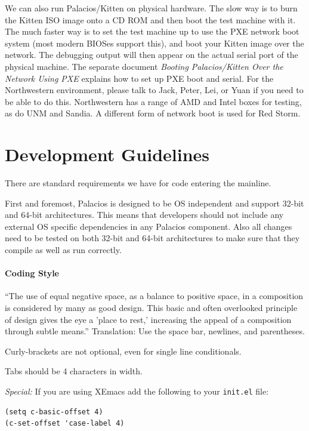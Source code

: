 \documentclass[11pt]{article}
\begin{document}
We can also run Palacios/Kitten on physical hardware.  The slow way is
to burn the Kitten ISO image onto a CD ROM and then boot the test
machine with it.  The much faster way is to set the test machine up to
use the PXE network boot system (most modern BIOSes support this), and
boot your Kitten image over the network.  The debugging output will
then appear on the actual serial port of the physical machine.  The
separate document {\em Booting Palacios/Kitten Over the Network Using
PXE} explains how to set up PXE boot and serial.  For the Northwestern
environment, please talk to Jack, Peter, Lei, or Yuan if you need to
be able to do this.  Northwestern has a range of AMD and Intel boxes
for testing, as do UNM and Sandia.  A different form of network boot
is used for Red Storm.


\section{Development Guidelines}

There are standard requirements we have for code entering the mainline. 

First and foremost, Palacios is designed to be OS independent and
support 32-bit and 64-bit architectures. This means that developers should
not include any external OS specific dependencies in any Palacios
component. Also all changes need to be tested on both 32-bit and 64-bit
architectures to make sure that they compile as well as run correctly.

\paragraph*{Coding Style}

``The use of equal negative space, as a balance to positive space, in a
composition is considered by many as good design. This basic and often
overlooked principle of design gives the eye a 'place to rest,'
increasing the appeal of a composition through subtle means.''
\newline\newline
Translation: Use the space bar, newlines, and parentheses. 

Curly-brackets are not optional, even for single line conditionals. 

Tabs should be 4 characters in width.

{\em Special:} If you are using XEmacs add the following to your \verb!init.el! file:
\begin{verbatim}
(setq c-basic-offset 4)
(c-set-offset 'case-label 4)
\end{verbatim}
\end{document}
